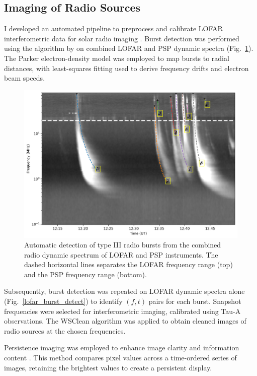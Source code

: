 \subsection{Imaging of Radio Sources}
I developed an automated pipeline to preprocess and calibrate LOFAR interferometric data for solar radio imaging \citep{zhang_radio_2022}. Burst detection was performed using the algorithm by \citet{zhang_2018} on combined LOFAR and PSP dynamic spectra (Fig.~\ref{lofar_psp_burst_detect}). The Parker electron-density model \citep{parker_1960} was employed to map bursts to radial distances, with least-squares fitting used to derive frequency drifts and electron beam speeds.

\begin{figure}
	\centering
	\includegraphics[width=0.8\hsize]{chapter3/figs/auto_detect_typeIIIs.png}
	\caption{Automatic detection of type III radio bursts from the combined radio dynamic spectrum of LOFAR and PSP instruments. The dashed horizontal lines separates the LOFAR frequency range (top) and the PSP frequency range (bottom).}
	\label{lofar_psp_burst_detect}
\end{figure}

Subsequently, burst detection was repeated on LOFAR dynamic spectra alone (Fig.~\ref{lofar_burst_detect}) to identify $(f,t)$ pairs for each burst. Snapshot frequencies were selected for interferometric imaging, calibrated using Tau-A observations. The WSClean algorithm \citep{wsclean_2014} was applied to obtain cleaned images of radio sources at the chosen frequencies.

Persistence imaging was employed to enhance image clarity and information content \citep{thompson_2016}. This method compares pixel values across a time-ordered series of images, retaining the brightest values to create a persistent display.

